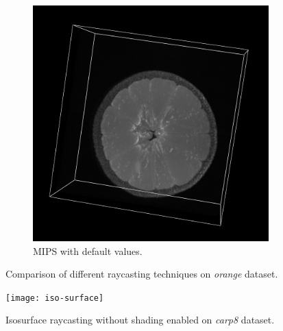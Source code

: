 \documentclass[a4paper]{article}
\begin{document}
\begin{figure}[h]
\begin{subfigure}[b]{0.45\textwidth}
    \includegraphics[width=\textwidth]{orange-mips}
    \caption{MIPS with default values.}
  \end{subfigure}
  \caption{Comparison of different raycasting techniques on \textit{orange} dataset.}
  \label{fig:mipscomp}
\end{figure}

\begin{figure}[h]
  \centering
  \texttt{[image: iso-surface]}
  \caption{Isosurface raycasting without shading enabled on \textit{carp8} dataset.}
  \label{fig:isosurface}
\end{figure}
\end{document}
